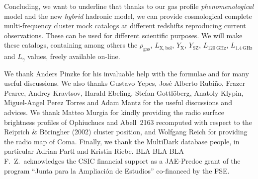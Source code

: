 \documentclass[traditabstract]{aa}
\newcommand{\rmn}{\mathrm}
\begin{document}
Concluding, we want to underline that thanks to our gas profile \emph{phenomenological} model and the new \emph{hybrid} hadronic model, we can provide cosmological complete multi-frequency cluster mock catalogs at different redshifts reproducing current observations. These can be used for different scientific purposes. We will make these catalogs, containing among others the $\rho_{\rmn{gas}}$, $L_{\rmn{X, bol}}$, $Y_{\rmn{X}}$, $Y_{\rmn{SZ}}$, $L_{120~\rmn{GHz}}$, $L_{1.4~\rmn{GHz}}$ and $L_{\gamma}$ values, freely available on-line.


\begin{acknowledgements}
We thank Anders Pinzke for his invaluable help with the formulae and for many useful discussions. We also thanks Gustavo Yepes, Jos\'e Alberto Rubi\~no, Frazer Pearce, Andrey Kravtsov, Harald Ebeling, Stefan Gottl\"{o}berg, Anatoly Klypin, Miguel-Angel Perez Torres and Adam Mantz for the useful discussions and advices. We thank Matteo Murgia for kindly providing the radio surface brightness profiles of Ophiuchucs and Abell~2163 recomputed with respect to the Reiprich \& B\"{o}ringher (2002) cluster position, and Wolfgang Reich for providing the radio map of Coma. Finally, we thank the MultiDark database people, in particular Adrian Partl and Kristin Riebe.
BLA BLA BLA\\ 
F.~Z.~acknowledges the CSIC financial support as a JAE-Predoc grant of the program ``Junta para la Ampliaci\'on de Estudios'' co-financed by the FSE.
\end{acknowledgements}




\end{document}
